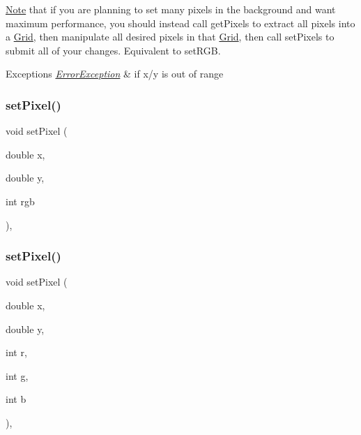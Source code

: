 \mbox{\hyperlink{classNote}{Note}} that if you are planning to set many pixels in the background and want maximum performance, you should instead call get\+Pixels to extract all pixels into a \mbox{\hyperlink{classGrid}{Grid}}, then manipulate all desired pixels in that \mbox{\hyperlink{classGrid}{Grid}}, then call set\+Pixels to submit all of your changes. Equivalent to set\+R\+GB.


\begin{DoxyExceptions}{Exceptions}
{\em \mbox{\hyperlink{classErrorException}{Error\+Exception}}} & if x/y is out of range \\
\hline
\end{DoxyExceptions}
\mbox{\label{classGForwardDrawingSurface_a1fd61df1d79ebf3db7935d5c38c222e5}} 
\subsubsection{\texorpdfstring{set\+Pixel()}{setPixel()}\hspace{0.1cm}{\footnotesize\ttfamily [2/3]}}
{\footnotesize\ttfamily void set\+Pixel (\begin{DoxyParamCaption}\item[{double}]{x,  }\item[{double}]{y,  }\item[{int}]{rgb }\end{DoxyParamCaption})\hspace{0.3cm}{\ttfamily [virtual]}, {\ttfamily [inherited]}}

\mbox{\label{classGForwardDrawingSurface_af9aca140f86a6de6a4368d41349dd57c}} 
\subsubsection{\texorpdfstring{set\+Pixel()}{setPixel()}\hspace{0.1cm}{\footnotesize\ttfamily [3/3]}}
{\footnotesize\ttfamily void set\+Pixel (\begin{DoxyParamCaption}\item[{double}]{x,  }\item[{double}]{y,  }\item[{int}]{r,  }\item[{int}]{g,  }\item[{int}]{b }\end{DoxyParamCaption})\hspace{0.3cm}{\ttfamily [virtual]}, {\ttfamily [inherited]}}

